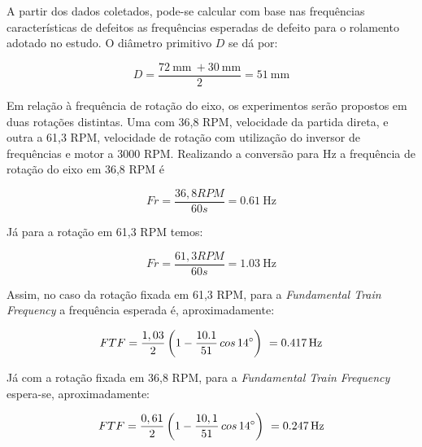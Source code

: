 \documentclass[
	12pt,				
	oneside,			
	a4paper,			
	english,			
	brazil,			
	]{abntex2ppgsi}
\begin{document}
\section{}

A partir dos dados coletados, pode-se calcular com base nas frequências características de defeitos as frequências esperadas de defeito para o rolamento adotado no estudo. O diâmetro primitivo $D$ se dá por: 

\begin{equation}
	D = \frac{\SI{72}{\mm} \ + \SI{30}{\mm}}{2} = \SI{51}{\mm}
	\label{eq: Diametro Primitivo no Rolamento}
\end{equation}


Em relação à frequência de rotação do eixo, os experimentos serão propostos em duas rotações distintas. Uma com 36,8 RPM, velocidade da partida direta, e outra a 61,3 RPM, velocidade de rotação com utilização do inversor de frequências e motor a 3000 RPM. Realizando a conversão para Hz a frequência de rotação do eixo em 36,8 RPM é

\begin{equation}
	Fr = \frac{36,8 RPM} {60s} = \SI{0,61}{\hertz}
	\label{eq: Frequencia do eixo em 36,8 RPM}
\end{equation}

Já para a rotação em 61,3 RPM temos:

\begin{equation}
	Fr = \frac{61,3 RPM} {60s} = \SI{1,03}{\hertz}
	\label{eq: Frequencia do eixo em 61,3 RPM}
\end{equation}

Assim, no caso da rotação fixada em 61,3 RPM, para a \textit{Fundamental Train Frequency} a frequência esperada é, aproximadamente: 

\begin{equation}
	FTF = \frac{1,03}{2} \left ( 1 - \frac{10.1}{51} \,cos \, \ang{14} \right )  \ = \SI{0,417}{{\hertz}}
	\label{eq: FTF no  Rolamento em 100Hz}
\end{equation}

Já com a rotação fixada em 36,8 RPM, para a \textit{Fundamental Train Frequency} espera-se, aproximadamente:

\begin{equation}
	FTF = \frac{0,61}{2} \left ( 1 - \frac{10,1}{51} \,cos \, \ang{14} \right )  \ = \SI{0,247}{{\hertz}}
	\label{eq: FTF no  Rolamento}
\end{equation}
\end{document}
